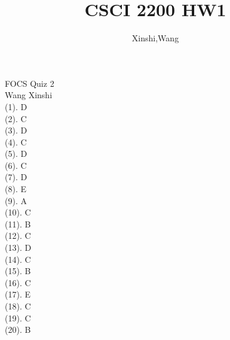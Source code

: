 \documentclass{article}
\title{CSCI 2200 HW1}
\author{Xinshi,Wang}
\begin{document}
\noindent
FOCS Quiz 2 \\
Wang Xinshi\\

\noindent (1). D\\
(2). C\\
(3). D\\
(4). C\\
(5). D\\
(6). C\\
(7). D\\
(8). E\\
(9). A\\
(10). C\\
(11). B\\
(12). C\\
(13). D\\
(14). C\\
(15). B\\
(16). C\\
(17). E\\
(18). C\\
(19). C\\
(20). B\\
\newpage
\end{document}
